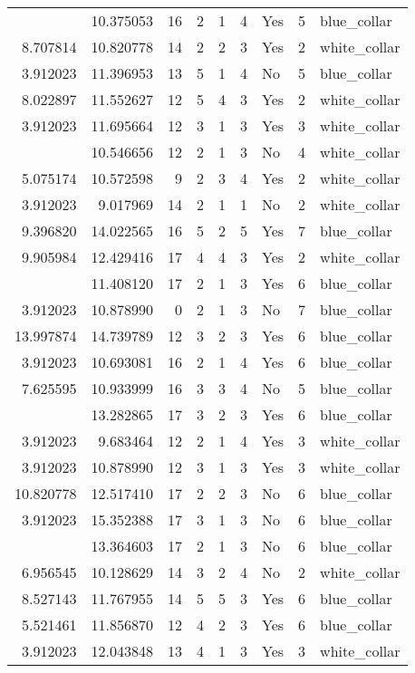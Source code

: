 \documentclass[
]{article}
\begin{document}
\begin{longtable}[t]{rrrrrllrl}
\addlinespace
3.912023 & 10.375053 & 16 & 2 & 1 & 4 & Yes & 5 & blue\_collar\\
8.707814 & 10.820778 & 14 & 2 & 2 & 3 & Yes & 2 & white\_collar\\
3.912023 & 11.396953 & 13 & 5 & 1 & 4 & No & 5 & blue\_collar\\
8.022897 & 11.552627 & 12 & 5 & 4 & 3 & Yes & 2 & white\_collar\\
3.912023 & 11.695664 & 12 & 3 & 1 & 3 & Yes & 3 & white\_collar\\
\addlinespace
3.912023 & 10.546656 & 12 & 2 & 1 & 3 & No & 4 & white\_collar\\
5.075174 & 10.572598 & 9 & 2 & 3 & 4 & Yes & 2 & white\_collar\\
3.912023 & 9.017969 & 14 & 2 & 1 & 1 & No & 2 & white\_collar\\
9.396820 & 14.022565 & 16 & 5 & 2 & 5 & Yes & 7 & blue\_collar\\
9.905984 & 12.429416 & 17 & 4 & 4 & 3 & Yes & 2 & white\_collar\\
\addlinespace
3.912023 & 11.408120 & 17 & 2 & 1 & 3 & Yes & 6 & blue\_collar\\
3.912023 & 10.878990 & 0 & 2 & 1 & 3 & No & 7 & blue\_collar\\
13.997874 & 14.739789 & 12 & 3 & 2 & 3 & Yes & 6 & blue\_collar\\
3.912023 & 10.693081 & 16 & 2 & 1 & 4 & Yes & 6 & blue\_collar\\
7.625595 & 10.933999 & 16 & 3 & 3 & 4 & No & 5 & blue\_collar\\
\addlinespace
13.527895 & 13.282865 & 17 & 3 & 2 & 3 & Yes & 6 & blue\_collar\\
3.912023 & 9.683464 & 12 & 2 & 1 & 4 & Yes & 3 & white\_collar\\
3.912023 & 10.878990 & 12 & 3 & 1 & 3 & Yes & 3 & white\_collar\\
10.820778 & 12.517410 & 17 & 2 & 2 & 3 & No & 6 & blue\_collar\\
3.912023 & 15.352388 & 17 & 3 & 1 & 3 & No & 6 & blue\_collar\\
\addlinespace
3.912023 & 13.364603 & 17 & 2 & 1 & 3 & No & 6 & blue\_collar\\
6.956545 & 10.128629 & 14 & 3 & 2 & 4 & No & 2 & white\_collar\\
8.527143 & 11.767955 & 14 & 5 & 5 & 3 & Yes & 6 & blue\_collar\\
5.521461 & 11.856870 & 12 & 4 & 2 & 3 & Yes & 6 & blue\_collar\\
3.912023 & 12.043848 & 13 & 4 & 1 & 3 & Yes & 3 & white\_collar\\

\end{longtable}
\end{document}
